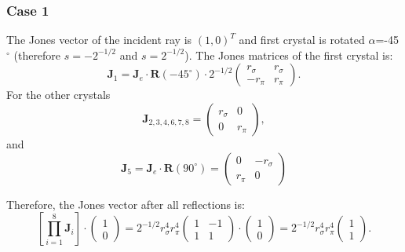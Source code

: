 \documentclass{iucr}
\begin{document}
\subsubsection{Case 1}
The Jones vector of the incident ray is $(1,0)^T$ and first crystal is rotated $\alpha$=-45$^\circ$ (therefore $s=-2^{-1/2}$ and $s=2^{-1/2}$). The Jones matrices of the first crystal is: 
\begin{equation}\label{eq:Jcase1_xtal1_S4}
    \textbf{J}_1=\textbf{J}_e \cdot \textbf{R}(-45^{\circ})
    \cdot
    2^{-1/2}
    \begin{pmatrix}
r_\sigma  &
r_\sigma \\
- r_\pi& 
r_\pi
\end{pmatrix}.
\end{equation}
For the other crystals
\begin{equation}\label{eq:Jcase1_S4}
\textbf{J}_{2,3,4,6,7,8}=
    \begin{pmatrix}
r_\sigma & 0\\
0& 
r_\pi
\end{pmatrix},
\end{equation}
and
\begin{equation}\label{eq:J5case1_S4}
\textbf{J}_{5}=\textbf{J}_e\cdot \textbf{R}(90^{\circ})
=
\begin{pmatrix}
0 & -r_\sigma\\
r_\pi& 0
\end{pmatrix}
\end{equation}

Therefore, the Jones vector after all reflections is:
\begin{equation}\label{eq:JVcase1_S4}
\left[ \prod_{i=1}^{8} \textbf{J}_i \right]
    \cdot
    \begin{pmatrix}
    1\\0
    \end{pmatrix}=
    2^{-1/2} r_\sigma^4 r_\pi^4
        \begin{pmatrix}
   1&-1\\
    1 & 1
    \end{pmatrix}
    \cdot
        \begin{pmatrix}
    1\\0
    \end{pmatrix}
    =
    2^{-1/2}r_\sigma^4 r_\pi^4
    \begin{pmatrix}
    1\\
    1
    \end{pmatrix}.
\end{equation}
\end{document}

